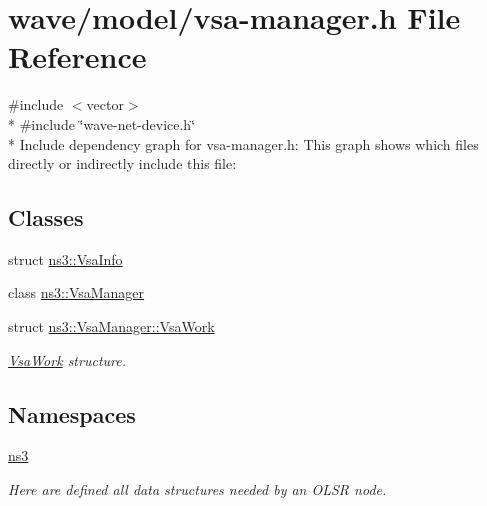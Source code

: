 \hypertarget{vsa-manager_8h}{}\section{wave/model/vsa-\/manager.h File Reference}
\label{vsa-manager_8h}
{\ttfamily \#include $<$vector$>$}\\*
{\ttfamily \#include \char`\"{}wave-\/net-\/device.\+h\char`\"{}}\\*
Include dependency graph for vsa-\/manager.h\+:
This graph shows which files directly or indirectly include this file\+:
\subsection*{Classes}
\begin{DoxyCompactItemize}
\item 
struct \hyperlink{structns3_1_1VsaInfo}{ns3\+::\+Vsa\+Info}
\item 
class \hyperlink{classns3_1_1VsaManager}{ns3\+::\+Vsa\+Manager}
\item 
struct \hyperlink{structns3_1_1VsaManager_1_1VsaWork}{ns3\+::\+Vsa\+Manager\+::\+Vsa\+Work}
\begin{DoxyCompactList}\small\item\em \hyperlink{structns3_1_1VsaManager_1_1VsaWork}{Vsa\+Work} structure. \end{DoxyCompactList}\end{DoxyCompactItemize}
\subsection*{Namespaces}
\begin{DoxyCompactItemize}
\item 
 \hyperlink{namespacens3}{ns3}
\begin{DoxyCompactList}\small\item\em Here are defined all data structures needed by an O\+L\+SR node. \end{DoxyCompactList}\end{DoxyCompactItemize}
